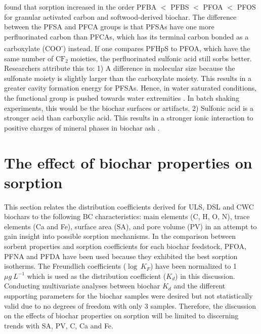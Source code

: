 \cite{zhang2021sorption} found that sorption increased in the order PFBA $<$ PFBS $<$ PFOA $<$ PFOS for granular activated carbon and softwood-derived biochar. The difference between the PFSA and PFCA groups is that PFSAs have one more perfluorinated carbon than PFCAs, which has its terminal carbon bonded as a carboxylate (COO\textsuperscript{-}) instead. If one compares PFHpS to PFOA, which have the same number of $\mathrm{CF_2}$ moieties, the perfluorinated sulfonic acid still sorbs better. Researchers attribute this to: 1) A difference in molecular size because the sulfonate moiety is slightly larger than the carboxylate moiety. This results in a greater cavity formation energy for PFSAs. Hence, in water saturated conditions, the functional group is pushed towards water extremities \citep{yin2022insights,sigmund2022sorption}. In batch shaking experiments, this would be the biochar surfaces or artifacts. 2) Sulfonic acid is a stronger acid than carboxylic acid. This results in a stronger ionic interaction to positive charges of mineral phases in biochar ash \citep{arvaniti2015review}. 


\section{The effect of biochar properties on sorption}
This section relates the distribution coefficients derived for ULS, DSL and CWC biochars to the following BC characteristics: main elements (C, H, O, N), trace elements (Ca and Fe), surface area (SA), and pore volume (PV) in an attempt to gain insight into possible sorption mechanisms. In the comparison between sorbent properties and sorption coefficients for each biochar feedstock, PFOA, PFNA and PFDA have been used because they exhibited the best sorption isotherms. The Freundlich coefficients ($\log~K_F$) have been normalized to 1 $\mu g~L^{-1}$ which is used as the distribution coefficient ($K_d$) in this discussion. Conducting multivariate analyses between biochar $K_d$ and the different supporting parameters for the biochar samples were desired but not statistically valid due to no degrees of freedom with only 3 samples. Therefore, the discussion on the effects of biochar properties on sorption will be limited to discerning trends with SA, PV, C, Ca and Fe. 


